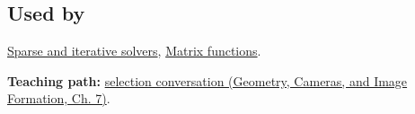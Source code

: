 \subsection{Used by}\label{appendix-221a483bec2d-used-by}

\hypertarget{appendix-221a483bec2d-used-by}{}

\hyperref[appendix-67c87a3d9e94]{Sparse and iterative solvers}, \hyperref[appendix-0f4bc2bf2b1f]{Matrix functions}.

\textbf{Teaching path:} \href{../03-Geometry-Cameras-and-Image-Formation/main.pdf\#nameddest=02-foundations-ii-ch038-close-the-journey-with-an-algorithm-selection-conversation}{selection conversation (Geometry, Cameras, and Image Formation, Ch. 7)}.
